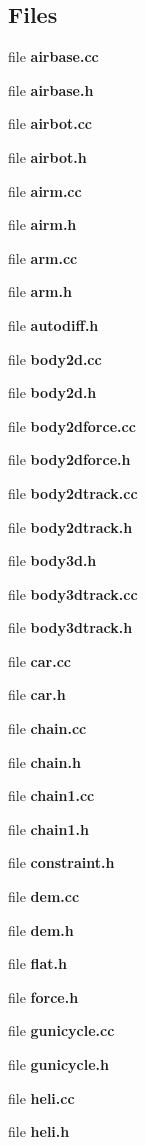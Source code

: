 \subsection*{\-Files}
\begin{DoxyCompactItemize}
\item 
file {\bf airbase.\-cc}
\item 
file {\bf airbase.\-h}
\item 
file {\bf airbot.\-cc}
\item 
file {\bf airbot.\-h}
\item 
file {\bf airm.\-cc}
\item 
file {\bf airm.\-h}
\item 
file {\bf arm.\-cc}
\item 
file {\bf arm.\-h}
\item 
file {\bf autodiff.\-h}
\item 
file {\bf body2d.\-cc}
\item 
file {\bf body2d.\-h}
\item 
file {\bf body2dforce.\-cc}
\item 
file {\bf body2dforce.\-h}
\item 
file {\bf body2dtrack.\-cc}
\item 
file {\bf body2dtrack.\-h}
\item 
file {\bf body3d.\-h}
\item 
file {\bf body3dtrack.\-cc}
\item 
file {\bf body3dtrack.\-h}
\item 
file {\bf car.\-cc}
\item 
file {\bf car.\-h}
\item 
file {\bf chain.\-cc}
\item 
file {\bf chain.\-h}
\item 
file {\bf chain1.\-cc}
\item 
file {\bf chain1.\-h}
\item 
file {\bf constraint.\-h}
\item 
file {\bf dem.\-cc}
\item 
file {\bf dem.\-h}
\item 
file {\bf flat.\-h}
\item 
file {\bf force.\-h}
\item 
file {\bf gunicycle.\-cc}
\item 
file {\bf gunicycle.\-h}
\item 
file {\bf heli.\-cc}
\item 
file {\bf heli.\-h}
\item 

\end{DoxyCompactItemize}
